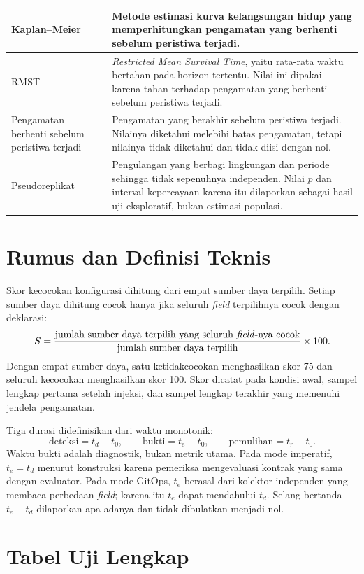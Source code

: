 \begin{table}[H]
\begin{tabularx}{\textwidth}{|>{\raggedright\arraybackslash}p{3.4cm}|>{\raggedright\arraybackslash}X|}
    \hline
    Kaplan--Meier & Metode estimasi kurva kelangsungan hidup yang memperhitungkan pengamatan yang berhenti sebelum peristiwa terjadi. \\
    \hline
    RMST & \textit{Restricted Mean Survival Time}, yaitu rata-rata waktu bertahan pada horizon tertentu. Nilai ini dipakai karena tahan terhadap pengamatan yang berhenti sebelum peristiwa terjadi. \\
    \hline
    Pengamatan berhenti sebelum peristiwa terjadi & Pengamatan yang berakhir sebelum peristiwa terjadi. Nilainya diketahui melebihi batas pengamatan, tetapi nilainya tidak diketahui dan tidak diisi dengan nol. \\
    \hline
    Pseudoreplikat & Pengulangan yang berbagi lingkungan dan periode sehingga tidak sepenuhnya independen. Nilai $p$ dan interval kepercayaan karena itu dilaporkan sebagai hasil uji eksploratif, bukan estimasi populasi. \\
    \hline
  \end{tabularx}
\end{table}

\section{Rumus dan Definisi Teknis}

Skor kecocokan konfigurasi dihitung dari empat sumber daya terpilih. Setiap sumber daya dihitung cocok hanya jika seluruh \textit{field} terpilihnya cocok dengan deklarasi:
\[
  S = \frac{\text{jumlah sumber daya terpilih yang seluruh \textit{field}-nya cocok}}{\text{jumlah sumber daya terpilih}} \times 100.
\]
Dengan empat sumber daya, satu ketidakcocokan menghasilkan skor 75 dan seluruh kecocokan menghasilkan skor 100. Skor dicatat pada kondisi awal, sampel lengkap pertama setelah injeksi, dan sampel lengkap terakhir yang memenuhi jendela pengamatan.

Tiga durasi didefinisikan dari waktu monotonik:
\[
  \text{deteksi} = t_d - t_0, \qquad
  \text{bukti} = t_e - t_0, \qquad
  \text{pemulihan} = t_r - t_0.
\]
Waktu bukti adalah diagnostik, bukan metrik utama. Pada mode imperatif, $t_e=t_d$ menurut konstruksi karena pemeriksa mengevaluasi kontrak yang sama dengan evaluator. Pada mode GitOps, $t_e$ berasal dari kolektor independen yang membaca perbedaan \textit{field}; karena itu $t_e$ dapat mendahului $t_d$. Selang bertanda $t_e-t_d$ dilaporkan apa adanya dan tidak dibulatkan menjadi nol.

\section{Tabel Uji Lengkap}

